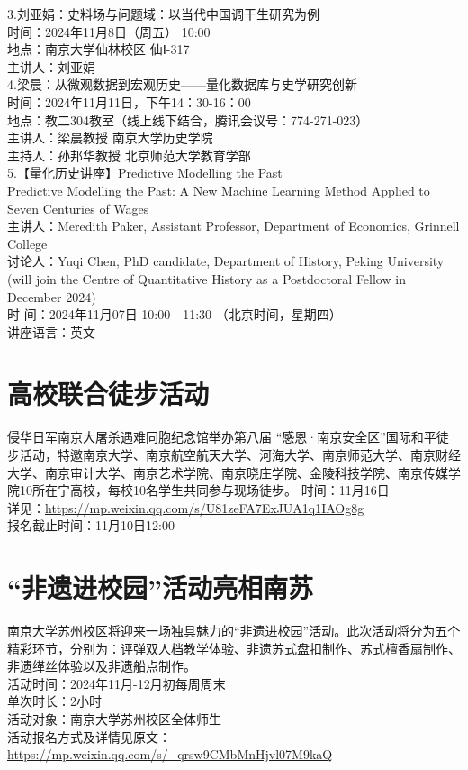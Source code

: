\documentclass[letterpaper, 12pt]{article}
\begin{document}
\begin{multicols}{2}
3.刘亚娟：史料场与问题域：以当代中国调干生研究为例\\
时间：2024年11月8日（周五） 10:00\\
地点：南京大学仙林校区 仙Ⅰ-317\\
主讲人：刘亚娟\\

4.梁晨：从微观数据到宏观历史——量化数据库与史学研究创新\\
时间：2024年11月11日，下午14：30-16：00\\
地点：教二304教室（线上线下结合，腾讯会议号：774-271-023）\\
主讲人：梁晨教授 南京大学历史学院\\
主持人：孙邦华教授 北京师范大学教育学部\\

5.【量化历史讲座】Predictive Modelling the Past\\
Predictive Modelling the Past: A New Machine Learning Method Applied to Seven Centuries of Wages\\
主讲人：Meredith Paker, Assistant Professor, Department of Economics, Grinnell College\\
讨论人：Yuqi Chen, PhD candidate, Department of History, Peking University (will join the Centre of Quantitative History as a Postdoctoral Fellow in December 2024)\\
时    间：2024年11月07日 10:00 - 11:30 （北京时间，星期四）\\
讲座语言：英文\\

\section{高校联合徒步活动}
侵华日军南京大屠杀遇难同胞纪念馆举办第八届 “感恩·南京安全区”国际和平徒步活动，特邀南京大学、南京航空航天大学、河海大学、南京师范大学、南京财经大学、南京审计大学、南京艺术学院、南京晓庄学院、金陵科技学院、南京传媒学院10所在宁高校，每校10名学生共同参与现场徒步。
时间：11月16日\\
详见：\url{https://mp.weixin.qq.com/s/U81zeFA7ExJUA1q1IAOg8g}\\
报名截止时间：11月10日12:00

\section{“非遗进校园”活动亮相南苏}
南京大学苏州校区将迎来一场独具魅力的“非遗进校园”活动。此次活动将分为五个精彩环节，分别为：评弹双人档教学体验、非遗苏式盘扣制作、苏式檀香扇制作、非遗缂丝体验以及非遗船点制作。\\
活动时间：2024年11月-12月初每周周末\\
单次时长：2小时\\
活动对象：南京大学苏州校区全体师生\\
活动报名方式及详情见原文：\url{https://mp.weixin.qq.com/s/_qrsw9CMbMnHjvl07M9kaQ}

\end{multicols}
\end{document}
